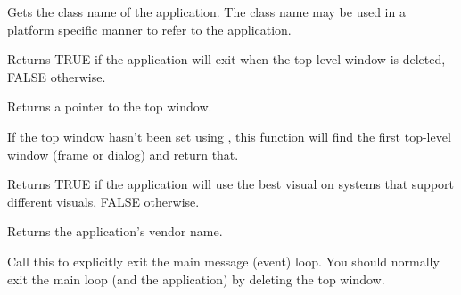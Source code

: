 Gets the class name of the application. The class name may be used in a platform specific
manner to refer to the application.



\label{wxappgetexitonframedelete}


Returns TRUE if the application will exit when the top-level window is deleted, FALSE
otherwise.



\label{wxappgettopwindow}


Returns a pointer to the top window.


If the top window hasn't been set using , this
function will find the first top-level window (frame or dialog) and return that.



\label{wxappgetusebestvisual}


Returns TRUE if the application will use the best visual on systems that support
different visuals, FALSE otherwise.



\label{wxappgetvendorname}


Returns the application's vendor name.

\label{wxappexitmainloop}


Call this to explicitly exit the main message (event) loop.
You should normally exit the main loop (and the application) by deleting
the top window.

